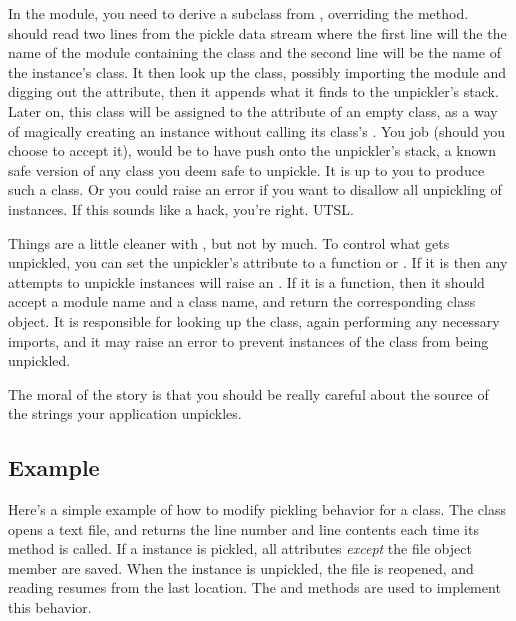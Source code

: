 In the  module, you need to derive a subclass from
, overriding the 
method.   should read two lines from the pickle
data stream where the first line will the the name of the module
containing the class and the second line will be the name of the
instance's class.  It then look up the class, possibly importing the
module and digging out the attribute, then it appends what it finds to
the unpickler's stack.  Later on, this class will be assigned to the
 attribute of an empty class, as a way of magically
creating an instance without calling its class's .
You job (should you choose to accept it), would be to have
 push onto the unpickler's stack, a known safe
version of any class you deem safe to unpickle.  It is up to you to
produce such a class.  Or you could raise an error if you want to
disallow all unpickling of instances.  If this sounds like a hack,
you're right.  UTSL.

Things are a little cleaner with , but not by much.
To control what gets unpickled, you can set the unpickler's
 attribute to a function or .  If it is
 then any attempts to unpickle instances will raise an
.  If it is a function,
then it should accept a module name and a class name, and return the
corresponding class object.  It is responsible for looking up the
class, again performing any necessary imports, and it may raise an
error to prevent instances of the class from being unpickled.

The moral of the story is that you should be really careful about the
source of the strings your application unpickles.

\subsection{Example \label{pickle-example}}

Here's a simple example of how to modify pickling behavior for a
class.  The  class opens a text file, and returns
the line number and line contents each time its 
method is called. If a  instance is pickled, all
attributes \emph{except} the file object member are saved. When the
instance is unpickled, the file is reopened, and reading resumes from
the last location. The  and
 methods are used to implement this behavior.

